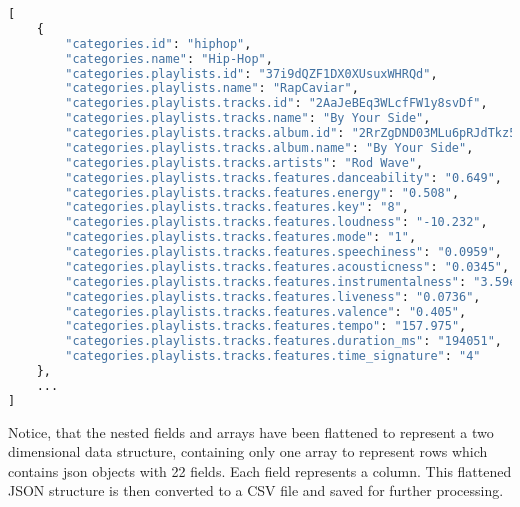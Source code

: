 \begin{lstlisting}[language=Python]
[
    {
        "categories.id": "hiphop",
        "categories.name": "Hip-Hop",
        "categories.playlists.id": "37i9dQZF1DX0XUsuxWHRQd",
        "categories.playlists.name": "RapCaviar",
        "categories.playlists.tracks.id": "2AaJeBEq3WLcfFW1y8svDf",
        "categories.playlists.tracks.name": "By Your Side",
        "categories.playlists.tracks.album.id": "2RrZgDND03MLu6pRJdTkz5",
        "categories.playlists.tracks.album.name": "By Your Side",
        "categories.playlists.tracks.artists": "Rod Wave",
        "categories.playlists.tracks.features.danceability": "0.649",
        "categories.playlists.tracks.features.energy": "0.508",
        "categories.playlists.tracks.features.key": "8",
        "categories.playlists.tracks.features.loudness": "-10.232",
        "categories.playlists.tracks.features.mode": "1",
        "categories.playlists.tracks.features.speechiness": "0.0959",
        "categories.playlists.tracks.features.acousticness": "0.0345",
        "categories.playlists.tracks.features.instrumentalness": "3.59e-05",
        "categories.playlists.tracks.features.liveness": "0.0736",
        "categories.playlists.tracks.features.valence": "0.405",
        "categories.playlists.tracks.features.tempo": "157.975",
        "categories.playlists.tracks.features.duration_ms": "194051",
        "categories.playlists.tracks.features.time_signature": "4"
    }, 
    ...
]
\end{lstlisting}

Notice, that the nested fields and arrays have been flattened to represent a two dimensional data structure,
containing only one array to represent rows which contains json objects with 22 fields. Each field represents
a column. This flattened JSON structure is then converted to a CSV file and saved for further processing.